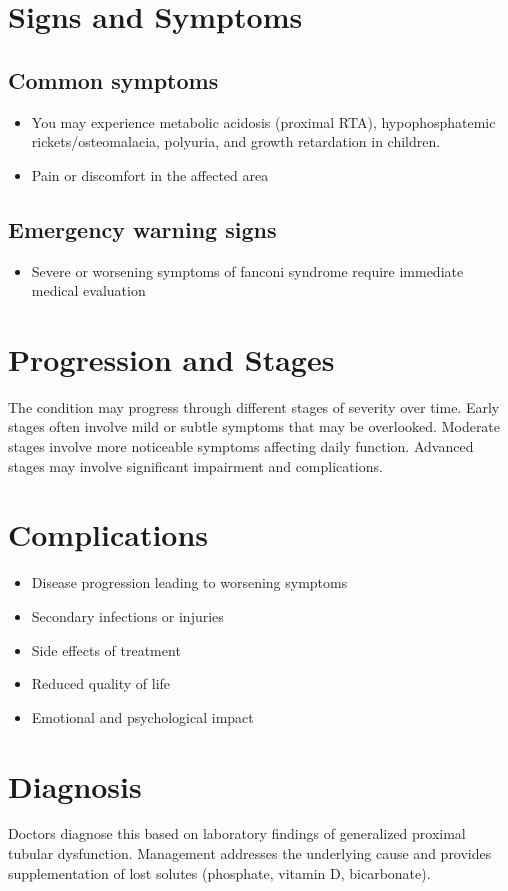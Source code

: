 \section{Signs and Symptoms}

\subsection{Common symptoms}
\begin{itemize}[noitemsep]
  \item You may experience metabolic acidosis (proximal RTA), hypophosphatemic rickets/osteomalacia, polyuria, and growth retardation in children.
  \item Pain or discomfort in the affected area
  \end{itemize}

\subsection{Emergency warning signs}
\begin{itemize}[noitemsep]
  \item Severe or worsening symptoms of fanconi syndrome require immediate medical evaluation
\end{itemize}
\section{Progression and Stages}
The condition may progress through different stages of severity over time. Early stages often involve mild or subtle symptoms that may be overlooked. Moderate stages involve more noticeable symptoms affecting daily function. Advanced stages may involve significant impairment and complications.
\section{Complications}
\begin{itemize}[noitemsep]
  \item Disease progression leading to worsening symptoms
  \item Secondary infections or injuries
  \item Side effects of treatment
  \item Reduced quality of life
  \item Emotional and psychological impact
\end{itemize}
\section{Diagnosis}
Doctors diagnose this based on laboratory findings of generalized proximal tubular dysfunction. Management addresses the underlying cause and provides supplementation of lost solutes (phosphate, vitamin D, bicarbonate).

